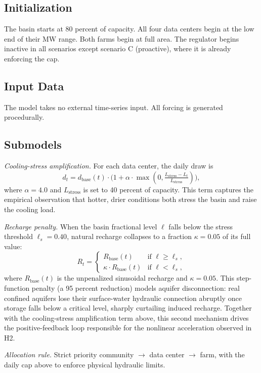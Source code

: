 \documentclass[sigconf,nonacm]{acmart}
\begin{document}
\subsection{Initialization}
The basin starts at 80 percent of capacity. All four data centers begin at the low end of their MW range. Both farms begin at full area. The regulator begins inactive in all scenarios except scenario C (proactive), where it is already enforcing the cap.

\subsection{Input Data}
The model takes no external time-series input. All forcing is generated procedurally.

\subsection{Submodels}

\textit{Cooling-stress amplification.} For each data center, the daily draw is
\[
d_t = d_{\text{base}}(t) \cdot \bigl(1 + \alpha \cdot \max(0, \tfrac{L_{\text{stress}} - L_t}{L_{\text{stress}}})\bigr),
\]
where $\alpha = 4.0$ and $L_{\text{stress}}$ is set to 40 percent of capacity. This term captures the empirical observation that hotter, drier conditions both stress the basin and raise the cooling load.

\textit{Recharge penalty.} When the basin fractional level $\ell$ falls below the stress threshold $\ell_s = 0.40$, natural recharge collapses to a fraction $\kappa = 0.05$ of its full value:
\[
R_t =
\begin{cases}
R_{\text{base}}(t) & \text{if } \ell \geq \ell_s, \\
\kappa \cdot R_{\text{base}}(t) & \text{if } \ell < \ell_s,
\end{cases}
\]
where $R_{\text{base}}(t)$ is the unpenalized sinusoidal recharge and $\kappa = 0.05$. This step-function penalty (a 95 percent reduction) models aquifer disconnection: real confined aquifers lose their surface-water hydraulic connection abruptly once storage falls below a critical level, sharply curtailing induced recharge. Together with the cooling-stress amplification term above, this second mechanism drives the positive-feedback loop responsible for the nonlinear acceleration observed in H2.

\textit{Allocation rule.} Strict priority community $\rightarrow$ data center $\rightarrow$ farm, with the daily cap above to enforce physical hydraulic limits.
\end{document}
